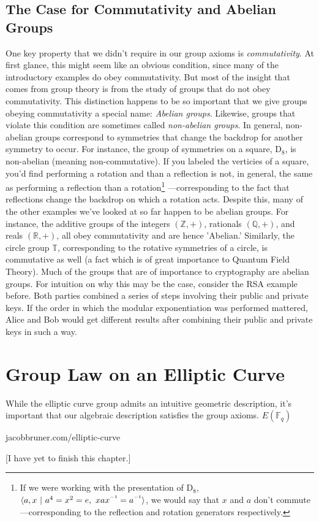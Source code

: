 \documentclass[11pt,a4paper]{article}
\newcommand{\inv}{^{\raisebox{.2em}{$\scriptscriptstyle-1$}}}
\newcommand{\reals}{\mathbb{R}}
\newcommand{\field}{\mathbb{F}}
\begin{document}
\subsection{The Case for Commutativity and Abelian Groups}
One key property that we didn't require in our group axioms is \textit{commutativity}. At first glance, this might seem like an obvious condition, since many of the introductory examples do obey commutativity. But most of the insight that comes from group theory is from the study of groups that do not obey commutativity. This distinction happens to be so important that we give groups obeying commutativity a special name: \textit{Abelian groups}.\autocite[17]{dummit} Likewise, groups that violate this condition are sometimes called \textit{non-abelian groups}. In general, non-abelian groups correspond to symmetries that change the backdrop for another symmetry to occur. For instance, the group of symmetries on a square, $\mathrm{D}_8$, is non-abelian (meaning non-commutative). If you labeled the verticies of a square, you'd find performing a rotation and than a reflection is not, in general, the same as performing a reflection than a rotation\footnote[2]{If we were working with the presentation of $\mathrm{D}_8$, $\langle a,x\ \vert \ a^4 = x^2 = e,\ xax\inv = a\inv \rangle$, we would say that $x$ and $a$ don't commute—corresponding to the reflection and rotation generators respectively.}
—corresponding to the fact that reflections change the backdrop on which a rotation acts. Despite this, many of the other examples we've looked at so far happen to be abelian groups. For instance, the additive groups of the integers $(\mathbb{Z},+)$, rationals $(\mathbb{Q},+)$, and reals $(\reals, +)$, all obey commutativity and are hence 'Abelian.' Similarly, the circle group $\mathbb{T}$, corresponding to the rotative symmetries of a circle, is commutative as well (a fact which is of great importance to Quantum Field Theory).
  Much of the groups that are of importance to cryptography are abelian groups. For intuition on why this may be the case, consider the RSA example before. Both parties combined a series of steps involving their public and private keys. If the order in which the modular exponentiation was performed mattered, Alice and Bob would get different results after combining their public and private keys in such a way.

\section{Group Law on an Elliptic Curve}
While the elliptic curve group admits an intuitive geometric description, it's important that our algebraic description satisfies the group axioms.  $ E(\field_{q} )$ 

jacobbruner.com/elliptic-curve

[I have yet to finish this chapter.]

\autocite[10]{koblitz}

\newpage 

\printbibliography
\end{document}
